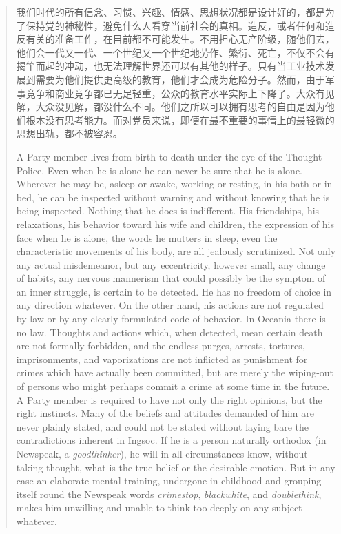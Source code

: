 \begin{paracol}{2}
\begin{quotation}
\switchcolumn

我们时代的所有信念、习惯、兴趣、情感、思想状况都是设计好的，都是为了保持党的神秘性，避免什么人看穿当前社会的真相。造反，或者任何和造反有关的准备工作，在目前都不可能发生。不用担心无产阶级，随他们去，他们会一代又一代、一个世纪又一个世纪地劳作、繁衍、死亡，不仅不会有揭竿而起的冲动，也无法理解世界还可以有其他的样子。只有当工业技术发展到需要为他们提供更高级的教育，他们才会成为危险分子。然而，由于军事竞争和商业竞争都已无足轻重，公众的教育水平实际上下降了。大众有见解，大众没见解，都没什么不同。他们之所以可以拥有思考的自由是因为他们根本没有思考能力。而对党员来说，即便在最不重要的事情上的最轻微的思想出轨，都不被容忍。

\switchcolumn*

A Party member lives from birth to death under the eye of the Thought
Police. Even when he is alone he can never be sure that he is alone.
Wherever he may be, asleep or awake, working or resting, in his bath or
in bed, he can be inspected without warning and without knowing that he
is being inspected. Nothing that he does is indifferent. His
friendships, his relaxations, his behavior toward his wife and children,
the expression of his face when he is alone, the words he mutters in
sleep, even the characteristic movements of his body, are all jealously
scrutinized. Not only any actual misdemeanor, but any eccentricity,
however small, any change of habits, any nervous mannerism that could
possibly be the symptom of an inner struggle, is certain to be detected.
He has no freedom of choice in any direction whatever. On the other
hand, his actions are not regulated by law or by any clearly formulated
code of behavior. In Oceania there is no law. Thoughts and actions
which, when detected, mean certain death are not formally forbidden, and
the endless purges, arrests, tortures, imprisonments, and vaporizations
are not inflicted as punishment for crimes which have actually been
committed, but are merely the wiping-out of persons who might perhaps
commit a crime at some time in the future. A Party member is required to
have not only the right opinions, but the right instincts. Many of the
beliefs and attitudes demanded of him are never plainly stated, and
could not be stated without laying bare the contradictions inherent in
Ingsoc. If he is a person naturally orthodox (in Newspeak, a
\emph{goodthinker}), he will in all circumstances know, without taking
thought, what is the true belief or the desirable emotion. But in any
case an elaborate mental training, undergone in childhood and grouping
itself round the Newspeak words \emph{crimestop}, \emph{blackwhite}, and
\emph{doublethink}, makes him unwilling and unable to think too deeply
on any subject whatever.


\end{quotation}
\end{paracol}
